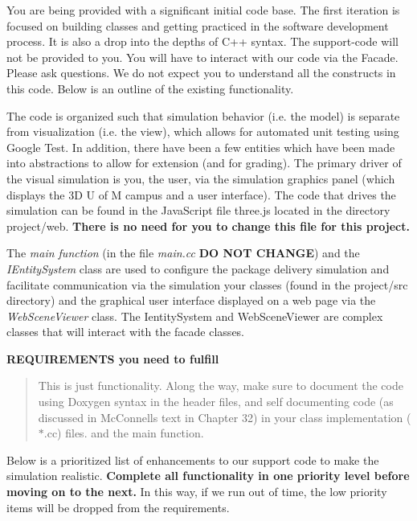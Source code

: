 You are being provided with a significant initial code base. The first iteration is focused on building classes and getting practiced in the software development process. It is also a drop into the depths of C++ syntax. The support-\/code will not be provided to you. You will have to interact with our code via the Facade. Please ask questions. We do not expect you to understand all the constructs in this code. Below is an outline of the existing functionality.

The code is organized such that simulation behavior (i.\+e. the model) is separate from visualization (i.\+e. the view), which allows for automated unit testing using Google Test. In addition, there have been a few entities which have been made into abstractions to allow for extension (and for grading). The primary driver of the visual simulation is you, the user, via the simulation graphics panel (which displays the 3D U of M campus and a user interface). The code that drives the simulation can be found in the Java\+Script file {\ttfamily three.\+js} located in the directory {\ttfamily project/web}. {\bfseries There is no need for you to change this file for this project.}

The {\itshape main function} (in the file {\itshape main.\+cc} {\bfseries DO N\+OT C\+H\+A\+N\+GE}) and the {\itshape I\+Entity\+System} class are used to configure the package delivery simulation and facilitate communication via the simulation your classes (found in the {\ttfamily project/src} directory) and the graphical user interface displayed on a web page via the {\itshape Web\+Scene\+Viewer} class. The Ientity\+System and Web\+Scene\+Viewer are complex classes that will interact with the facade classes. 



{\bfseries R\+E\+Q\+U\+I\+R\+E\+M\+E\+N\+TS you need to fulfill}

\begin{quote}
This is just functionality. Along the way, make sure to document the code using Doxygen syntax in the header files, and self documenting code (as discussed in Mc\+Connell\textquotesingle{}s text in Chapter 32) in your class implementation ($\ast$.cc) files. and the main function. \end{quote}


Below is a prioritized list of enhancements to our support code to make the simulation realistic. {\bfseries Complete all functionality in one priority level before moving on to the next.} In this way, if we run out of time, the low priority items will be dropped from the requirements.

